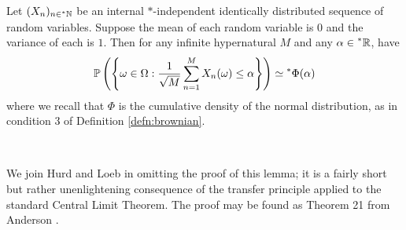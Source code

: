 \documentclass[11pt]{amsart}
\theoremstyle{remark}
\newcommand{\hyp}[1][\mathbb{R}]{\prescript{*}{}{#1}}
\newcommand{\near}{\simeq}
\newcommand{\gaussian}{\Phi}
\begin{document}
\pagebreak

\begin{lemma} \label{thm:clt}
Let $(X_n)_{n \in \hyp[\mathbb{N}]}$ be an internal $*$-independent identically distributed sequence of random variables.
Suppose the mean of each random variable is $0$ and the variance of each is $1$.
Then for any infinite hypernatural $M$ and any $\alpha \in \hyp$, have $$\mathbb{P}\left(\left\{ \omega \in \Omega: \frac{1}{\sqrt{M}} \sum_{n=1}^{M} X_n(\omega) \leq \alpha \right\}\right) \near \hyp[\gaussian](\alpha)$$
where we recall that $\gaussian$ is the cumulative density of the normal distribution, as in condition 3 of Definition \ref{defn:brownian}.
\end{lemma}

\

We join Hurd and Loeb in omitting the proof of this lemma; it is a fairly short but rather unenlightening consequence of the transfer principle applied to the standard Central Limit Theorem.
The proof may be found as Theorem 21 from Anderson \cite{anderson}.

\
\end{document}
